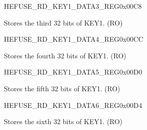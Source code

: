 \begin{register}{H}{EFUSE\_RD\_KEY1\_DATA3\_REG}{0x00C8}\label{regdesc:EFUSERDKEY1DATA3REG}
%
\regnewline%
\begin{regdesc}\begin{reglist}
\label{fielddesc:EFUSEKEY1DATA3}\item [EFUSE\_KEY1\_DATA3] Stores the third 32 bits of KEY1. (RO)
\end{reglist}\end{regdesc}
\end{register}


\begin{register}{H}{EFUSE\_RD\_KEY1\_DATA4\_REG}{0x00CC}\label{regdesc:EFUSERDKEY1DATA4REG}
%
\regnewline%
\begin{regdesc}\begin{reglist}
\label{fielddesc:EFUSEKEY1DATA4}\item [EFUSE\_KEY1\_DATA4] Stores the fourth 32 bits of KEY1. (RO)
\end{reglist}\end{regdesc}
\end{register}


\begin{register}{H}{EFUSE\_RD\_KEY1\_DATA5\_REG}{0x00D0}\label{regdesc:EFUSERDKEY1DATA5REG}
%
\regnewline%
\begin{regdesc}\begin{reglist}
\label{fielddesc:EFUSEKEY1DATA5}\item [EFUSE\_KEY1\_DATA5] Stores the fifth 32 bits of KEY1. (RO)
\end{reglist}\end{regdesc}
\end{register}


\begin{register}{H}{EFUSE\_RD\_KEY1\_DATA6\_REG}{0x00D4}\label{regdesc:EFUSERDKEY1DATA6REG}
%
\regnewline%
\begin{regdesc}\begin{reglist}
\label{fielddesc:EFUSEKEY1DATA6}\item [EFUSE\_KEY1\_DATA6] Stores the sixth 32 bits of KEY1. (RO)
\end{reglist}\end{regdesc}
\end{register}


